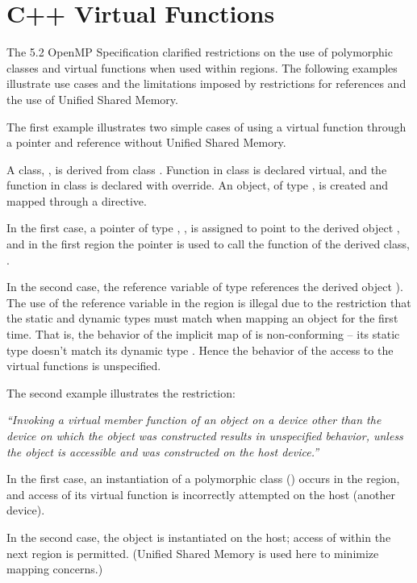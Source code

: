 \section{C++ Virtual Functions}
\label{sec:virtual_functions}


The 5.2 OpenMP Specification clarified restrictions on the use 
of polymorphic classes and virtual functions when used within 
 regions. The following examples illustrate 
use cases and the limitations imposed by restrictions for
references and the use of Unified Shared Memory. 

The first example illustrates two simple cases of using a virtual function
through a pointer and reference without Unified Shared Memory. 

A class, , is derived from class .  
Function  in class  is declared
virtual, and the function  in class  is declared with override.
An object,  of type , is created and mapped through a 
directive.

In the first case, a pointer of type , , is assigned to point 
to the derived object , and in the first  region the pointer
is used to call the  function of the derived class, .

In the second case, the reference variable  of type  references 
the derived object ).  The use of the reference variable  
in the  region is illegal due to the restriction that the static and dynamic 
types must match when mapping an object for the first time.
That is, the behavior of the implicit map of  
is non-conforming -- its static type  doesn't match its dynamic type .  
Hence the behavior of the access to the virtual functions is unspecified.


The second example illustrates the restriction:

\emph{``Invoking a virtual member function of an object on a device other than the device on which the
object was constructed results in unspecified behavior, unless the object is accessible and was
constructed on the host device.''}

In the first case, an instantiation  of a polymorphic class () occurs in the 
 region, and access of its virtual function
is incorrectly attempted on the host (another device).

In the second case, the object  is instantiated on the host; access of  within
the next  region is permitted. (Unified Shared Memory is
used here to minimize mapping concerns.)

